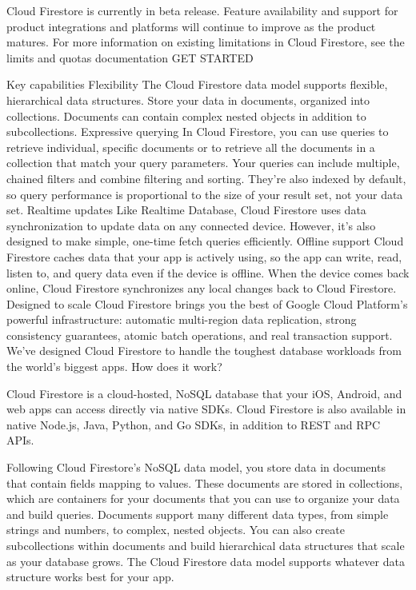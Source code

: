 Cloud Firestore is currently in beta release. Feature availability and support for product integrations and platforms will continue to improve as the product matures. For more information on existing limitations in Cloud Firestore, see the limits and quotas documentation
GET STARTED

Key capabilities
Flexibility	The Cloud Firestore data model supports flexible, hierarchical data structures. Store your data in documents, organized into collections. Documents can contain complex nested objects in addition to subcollections.
Expressive querying	In Cloud Firestore, you can use queries to retrieve individual, specific documents or to retrieve all the documents in a collection that match your query parameters. Your queries can include multiple, chained filters and combine filtering and sorting. They're also indexed by default, so query performance is proportional to the size of your result set, not your data set.
Realtime updates	Like Realtime Database, Cloud Firestore uses data synchronization to update data on any connected device. However, it's also designed to make simple, one-time fetch queries efficiently.
Offline support	Cloud Firestore caches data that your app is actively using, so the app can write, read, listen to, and query data even if the device is offline. When the device comes back online, Cloud Firestore synchronizes any local changes back to Cloud Firestore.
Designed to scale	Cloud Firestore brings you the best of Google Cloud Platform's powerful infrastructure: automatic multi-region data replication, strong consistency guarantees, atomic batch operations, and real transaction support. We've designed Cloud Firestore to handle the toughest database workloads from the world's biggest apps.
How does it work?


Cloud Firestore is a cloud-hosted, NoSQL database that your iOS, Android, and web apps can access directly via native SDKs. Cloud Firestore is also available in native Node.js, Java, Python, and Go SDKs, in addition to REST and RPC APIs.

Following Cloud Firestore's NoSQL data model, you store data in documents that contain fields mapping to values. These documents are stored in collections, which are containers for your documents that you can use to organize your data and build queries. Documents support many different data types, from simple strings and numbers, to complex, nested objects. You can also create subcollections within documents and build hierarchical data structures that scale as your database grows. The Cloud Firestore data model supports whatever data structure works best for your app.

